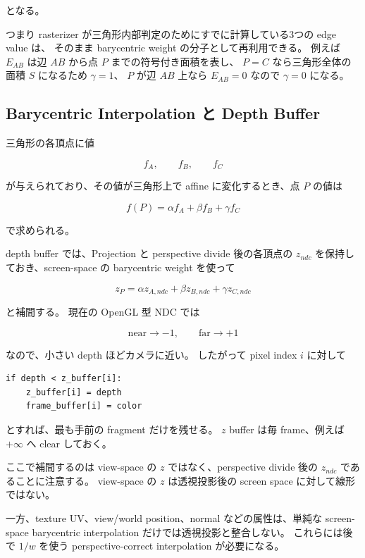 \documentclass[a4paper,11pt]{ltjsarticle}
\begin{document}
となる。

つまり rasterizer が三角形内部判定のためにすでに計算している3つの edge value は、
そのまま barycentric weight の分子として再利用できる。
例えば $E_{AB}$ は辺 $AB$ から点 $P$ までの符号付き面積を表し、
$P=C$ なら三角形全体の面積 $S$ になるため $\gamma=1$、
$P$ が辺 $AB$ 上なら $E_{AB}=0$ なので $\gamma=0$ になる。

\subsection{Barycentric Interpolation と Depth Buffer}

三角形の各頂点に値

\[
  f_A,\qquad f_B,\qquad f_C
\]

が与えられており、その値が三角形上で affine に変化するとき、点 $P$ の値は

\begin{equation}
  \boxed{
    f(P)=\alpha f_A+\beta f_B+\gamma f_C
  }
\end{equation}

で求められる。

depth buffer では、Projection と perspective divide 後の各頂点の
$z_{ndc}$ を保持しておき、screen-space の barycentric weight を使って

\begin{equation}
  z_P
  =\alpha z_{A,ndc}
  +\beta z_{B,ndc}
  +\gamma z_{C,ndc}
\end{equation}

と補間する。
現在の OpenGL 型 NDC では

\[
  \text{near}\rightarrow-1,
  \qquad
  \text{far}\rightarrow+1
\]

なので、小さい depth ほどカメラに近い。
したがって pixel index $i$ に対して

\begin{verbatim}
if depth < z_buffer[i]:
    z_buffer[i] = depth
    frame_buffer[i] = color
\end{verbatim}

とすれば、最も手前の fragment だけを残せる。
$z$ buffer は毎 frame、例えば $+\infty$ へ clear しておく。

ここで補間するのは view-space の $z$ ではなく、perspective divide 後の
$z_{ndc}$ であることに注意する。
view-space の $z$ は透視投影後の screen space に対して線形ではない。

一方、texture UV、view/world position、normal などの属性は、単純な screen-space
barycentric interpolation だけでは透視投影と整合しない。
これらには後で $1/w$ を使う perspective-correct interpolation が必要になる。
\end{document}
